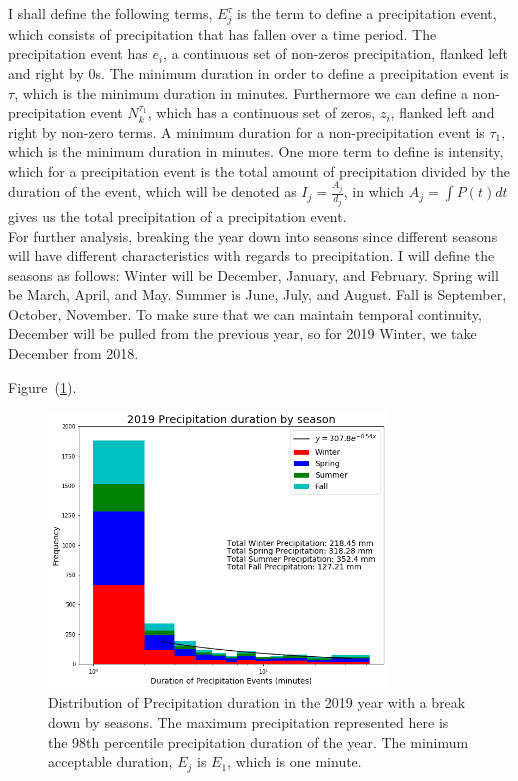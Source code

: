 \documentclass[11pt]{report}
\begin{document}
I shall define the following terms, $E_j^\tau $ is the term to define
a precipitation event, which consists of precipitation that has fallen
over a time period. The precipitation event has $e_i$, a continuous
set of non-zeros precipitation, flanked left and right by 0s. The
minimum duration in order to define a precipitation event is $\tau$,
which is the minimum duration in minutes. Furthermore we can define a
non-precipitation event $N_k^{\tau_1}$, which has a continuous set of
zeros, $z_i$, flanked left and right by non-zero terms. A minimum
duration for a non-precipitation event is $\tau_1$, which is the
minimum duration in minutes. One more term to define is intensity,
which for a precipitation event is the total amount of precipitation
divided by the duration of the event, which will be denoted as $I_j =
\frac{A_j}{d_j}$, in which $A_j = \int P(t) dt$ gives us the total
precipitation of a precipitation event.  \\ For further analysis,
breaking the year down into seasons since different seasons will have
different characteristics with regards to precipitation. I will define
the seasons as follows: Winter will be December, January, and
February. Spring will be March, April, and May. Summer is June, July,
and August. Fall is September, October, November. To make sure that we
can maintain temporal continuity, December will be pulled from the
previous year, so for 2019 Winter, we take December from 2018. 

Figure~(\ref{p2019}).

\begin{figure}[h]
  \centering
  \includegraphics[width=0.8\textwidth]{Figures/More_detail_precip_2019.png}
  \caption[Precipitation histogram for 2019 seasons]{\label{p2019}
    Distribution of Precipitation duration in the 2019 year with a
    break down by seasons. The maximum precipitation represented here
    is the 98th percentile precipitation duration of the year.  The
    minimum acceptable duration, $E_j$ is $E_1$, which is one minute.
  }
\end{figure}
\end{document}
